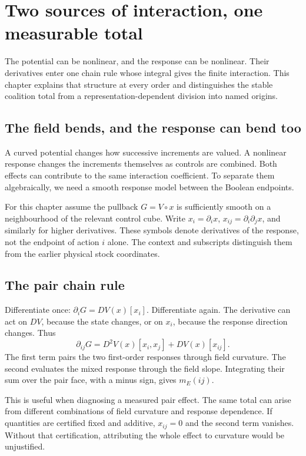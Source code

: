 \chapter{Two sources of interaction, one measurable total}\label{ch:origins}

The potential can be nonlinear, and the response can be nonlinear. Their derivatives enter one chain rule whose integral gives the finite interaction. This chapter explains that structure at every order and distinguishes the stable coalition total from a representation-dependent division into named origins.


\section{The field bends, and the response can bend too}
A curved potential changes how successive increments are valued. A nonlinear response changes the increments themselves as controls are combined. Both effects can contribute to the same interaction coefficient. To separate them algebraically, we need a smooth response model between the Boolean endpoints.

For this chapter assume the pullback $G=V\circ x$ is sufficiently smooth on a neighbourhood of the relevant control cube. Write $x_i=\partial_i x$, $x_{ij}=\partial_i\partial_jx$, and similarly for higher derivatives. These symbols denote derivatives of the response, not the endpoint of action $i$ alone. The context and subscripts distinguish them from the earlier physical stock coordinates.

\section{The pair chain rule}
Differentiate once: $\partial_iG=DV(x)[x_i]$. Differentiate again. The derivative can act on $DV$, because the state changes, or on $x_i$, because the response direction changes. Thus
\begin{equation}\label{eq:pair-chain}
 \partial_{ij}G=D^2V(x)[x_i,x_j]+DV(x)[x_{ij}].
\end{equation}
The first term pairs the two first-order responses through field curvature. The second evaluates the mixed response through the field slope. Integrating their sum over the pair face, with a minus sign, gives $m_E(ij)$.

This is useful when diagnosing a measured pair effect. The same total can arise from different combinations of field curvature and response dependence. If quantities are certified fixed and additive, $x_{ij}=0$ and the second term vanishes. Without that certification, attributing the whole effect to curvature would be unjustified.

